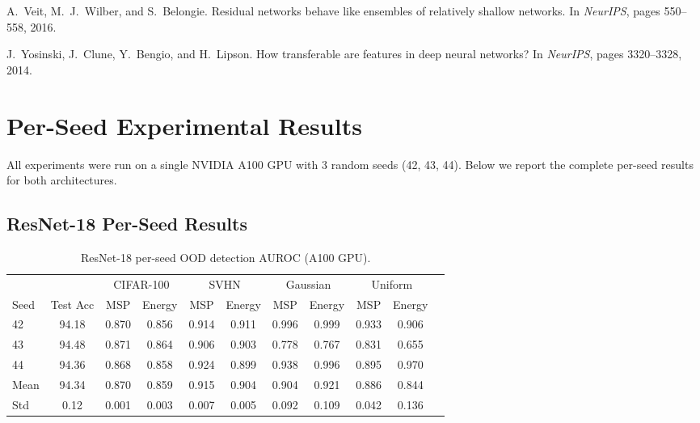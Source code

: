 \documentclass{article}
\begin{document}
\begin{thebibliography}{25}
A.~Veit, M.~J.~Wilber, and S.~Belongie.
\newblock Residual networks behave like ensembles of relatively shallow networks.
\newblock In \emph{NeurIPS}, pages 550--558, 2016.

J.~Yosinski, J.~Clune, Y.~Bengio, and H.~Lipson.
\newblock How transferable are features in deep neural networks?
\newblock In \emph{NeurIPS}, pages 3320--3328, 2014.

\end{thebibliography}

\newpage
\appendix
\section{Per-Seed Experimental Results}
\label{app:per_seed}

All experiments were run on a single NVIDIA A100 GPU with 3 random seeds (42, 43, 44). Below we report the complete per-seed results for both architectures.

\subsection{ResNet-18 Per-Seed Results}

\begin{table}[h]
\centering
\caption{ResNet-18 per-seed OOD detection AUROC (A100 GPU).}
\label{tab:resnet_perseed}
\small
\begin{tabular}{@{}lcccccccccc@{}}
\toprule
& & \multicolumn{2}{c}{CIFAR-100} & \multicolumn{2}{c}{SVHN} & \multicolumn{2}{c}{Gaussian} & \multicolumn{2}{c}{Uniform} \\
\cmidrule(lr){3-4} \cmidrule(lr){5-6} \cmidrule(lr){7-8} \cmidrule(lr){9-10}
Seed & Test Acc & MSP & Energy & MSP & Energy & MSP & Energy & MSP & Energy \\
\midrule
42 & 94.18 & 0.870 & 0.856 & 0.914 & 0.911 & 0.996 & 0.999 & 0.933 & 0.906 \\
43 & 94.48 & 0.871 & 0.864 & 0.906 & 0.903 & 0.778 & 0.767 & 0.831 & 0.655 \\
44 & 94.36 & 0.868 & 0.858 & 0.924 & 0.899 & 0.938 & 0.996 & 0.895 & 0.970 \\
\midrule
Mean & 94.34 & 0.870 & 0.859 & 0.915 & 0.904 & 0.904 & 0.921 & 0.886 & 0.844 \\
Std & 0.12 & 0.001 & 0.003 & 0.007 & 0.005 & 0.092 & 0.109 & 0.042 & 0.136 \\
\bottomrule
\end{tabular}
\end{table}
\end{document}
